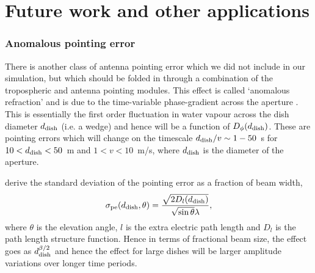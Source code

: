 




\section{Future work and other applications}\label{sec:improv}

\subsubsection{Anomalous pointing error}
There is another class of antenna pointing error which we did not include in our simulation, but which should be folded in through a combination of the tropospheric and antenna pointing modules. This effect is called `anomalous refraction' and is due to the time-variable phase-gradient across the aperture \citep[e.g.][]{Holdaway_1997,Butler_1997,Holdaway_1998}. This is essentially the first order fluctuation in water vapour across the dish diameter $d_{\rm dish}$ (i.e. a wedge) and hence will be a function of $D_{\phi}(d_{\rm dish})$. These are pointing errors which will change on the timescale $d_{\rm dish}/v \sim 1-50$~s for $10<d_{\rm dish}<50$~m and $1<v<10$~m/s, where $d_{\rm dish}$ is the diameter of the aperture.  

\citet{Holdaway_1998} derive the standard deviation of the pointing error as a fraction of beam width,
\begin{equation}
 \sigma_{\rm pe}(d_{\rm dish},\theta) = \frac{\sqrt{2 D_l(d_{\rm dish})}}{\sqrt{\sin\theta}\lambda},
\end{equation}
where $\theta$ is the elevation angle, $l$ is the extra electric path length and $D_l$ is the path length structure function. Hence in terms of fractional beam size, the effect goes as $d_{\rm dish}^{\beta/2}$ and hence the effect for large dishes will be larger amplitude variations over longer time periods. 


